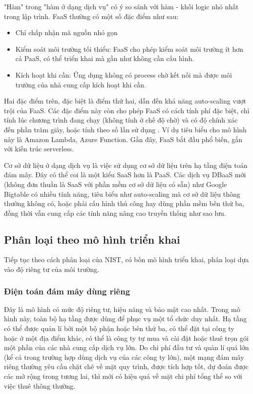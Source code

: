 \documentclass{article}
\begin{document}
"Hàm" trong "hàm ở dạng dịch vụ" có ý so sánh với hàm - khối logic nhỏ nhất
trong lập trình. FaaS thường có một số đặc điểm như sau:

\begin{itemize}
    \item Chỉ chấp nhận mã nguồn nhỏ gọn
    \item Kiểm soát môi trường tối thiểu: FaaS cho phép kiểm soát môi trường ít
    hơn cả PaaS, có thể triển khai mà gần như không cần cấu hình.
    \item Kích hoạt khi cần: Ứng dụng không có process chờ kết nối mà được môi
    trường của nhà cung cấp kích hoạt khi cần.
\end{itemize}

Hai đặc điểm trên, đặc biệt là điểm thứ hai, dẫn đến khả năng auto-scaling vượt
trội của FaaS. Các đặc điểm này còn cho phép FaaS có cách tính phí đặc biệt, chỉ
tính lúc chương trình đang chạy (không tính ở chế độ chờ) và có độ chính xác đến
phần trăm giây, hoặc tính theo số lần sử dụng \cite{CFPvF}. Ví dụ tiêu biểu cho
mô hình này là Amazon Lambda, Azure Function. Gần đây, FaaS bắt đầu phổ biến,
gắn với kiến trúc serverless.

Cơ sở dữ liệu ở dạng dịch vụ là việc sử dụng cơ sở dữ liệu trên hạ tầng điện
toán đám mây. Đây có thể coi là một kiểu SaaS hơn là PaaS. Các dịch vụ DBaaS mới
(không đơn thuần là SaaS với phần mềm cơ sở dữ liệu có sẵn) như Google Bigtable
có nhiều tính năng, tiêu biểu như auto-scaling mà cơ sở dữ liệu thông thường
không có, hoặc phải cấu hình thủ công hay dùng phần mềm bên thứ ba, đồng thời
vẫn cung cấp các tính năng nâng cao truyền thống như sao lưu.

\subsection{Phân loại theo mô hình triển khai}

Tiếp tục theo cách phân loại của NIST, có bốn mô hình triển khai, phân loại dựa
vào độ riêng tư của môi trường.

\subsubsection{Điện toán đám mây dùng riêng}

Đây là mô hình có mức độ riêng tư, hiệu năng và bảo mật cao nhất. Trong mô hình
này, toàn bộ hạ tầng được dùng để phục vụ một tổ chức duy nhất. Hạ tầng có thể
được quản lí bởi một bộ phận hoặc bên thứ ba, có thể đặt tại công ty hoặc ở một
địa điểm khác, có thể là công ty tự mua và cài đặt hoặc thuê trọn gói một phần
của các nhà cung cấp dịch vụ lớn. Do chi phí đầu tư và quản lí quá lớn (kể cả
trong trường hợp dùng dịch vụ của các công ty lớn), một mạng đám mây riêng
thường yêu cầu chặt chẽ về mặt quy trình, được tích hợp tốt, dự đoán được các mở
rộng trong tương lai, thì mới có hiệu quả về mặt chi phí tổng thể so với việc
thuê thông thường.
\end{document}
